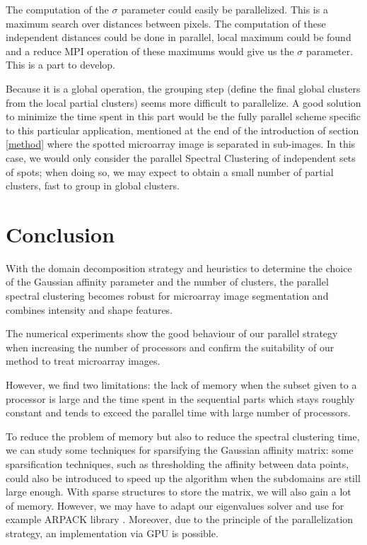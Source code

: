 \documentclass[runningheads,a4paper]{llncs}
\begin{document}
The computation of the $\sigma$ parameter could easily be parallelized. This
is a maximum search over distances between pixels. The computation of these
independent distances could be done in parallel,  local maximum could be found
and a reduce MPI operation of these maximums would give us the $\sigma$
parameter. This is a part to develop.

Because it is a global operation, the grouping step (define the final global
clusters from the local partial clusters) seems more difficult to parallelize.
A good solution to minimize the time spent in this part would be the fully
parallel scheme specific to this particular application, mentioned at the end
of the introduction of section \ref{method} where the spotted microarray image
is separated in sub-images. In this case, we would only consider the parallel
Spectral Clustering of independent sets of spots; when doing so, we may expect
to obtain a small number of partial clusters, fast to group in global
clusters.

\section{Conclusion}

With the domain decomposition strategy and heuristics to determine the
choice of the Gaussian affinity parameter and the number of clusters, the
parallel spectral clustering becomes robust for microarray image segmentation
and combines intensity and shape features.

The numerical experiments show the good behaviour of our parallel strategy
when increasing the number of processors and confirm the suitability of our
method to treat microarray images. 

However, we find two limitations: the lack of memory when the subset given to
a processor is large and the time spent in the sequential parts which stays
roughly constant and tends to exceed the parallel time with large number of
processors.

To reduce the problem of memory but also to reduce the spectral clustering
time, we can study some techniques for sparsifying the Gaussian affinity
matrix: some sparsification techniques, such as thresholding the affinity
between data points, could also be introduced to speed up the algorithm when
the subdomains are still large enough. With sparse structures to store the
matrix, we will also gain a lot of memory.  However, we may have to adapt our
eigenvalues solver and use for example ARPACK library
\cite{lehoucq1998arpack}. Moreover, due to the principle of the
parallelization strategy, an implementation via GPU is possible.
 
\end{document}
